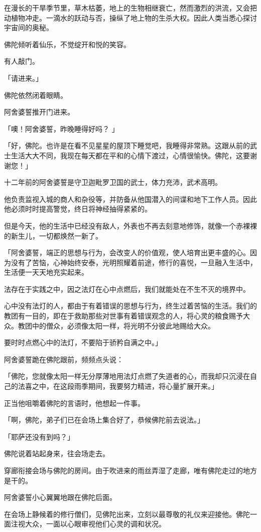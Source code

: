 \documentclass[twoside,openany]{book}
\begin{document}
在漫长的干旱季节里，草木枯萎，地上的生物相继衰亡，然而激烈的洪流，又会把动植物冲走。一滴水的跃动与否，操纵了地上物的生杀大权。因此人类当悉心探讨宇宙间的奥秘。

佛陀倾听着仙乐，不觉绽开和悦的笑容。

有人敲门。

「请进来。」

佛陀依然闭着眼睛。

阿舍婆誓推开门进来。

「噢！阿舍婆誓，昨晚睡得好吗？	」

「好，佛陀。也许是在看不见星星的屋顶下睡觉吧，我睡得非常熟。这跟从前的武士生活大大不同，我现在每天都在平和的心情下渡过，心情很愉快。佛陀，这要谢谢您！」

十二年前的阿舍婆誓是守卫迦毗罗卫国的武士，体力充沛，武术高明。

他负责监视入城的商人和杂役等，并防备从他国潜入的间谍和地下工作人员。因此他必须时时提高警觉，终日将神经抽得紧紧的。

但是今天，他的生活中已经没有敌人，外表也不再去刻意地修饰，就像一个赤裸裸的新生儿，一切都焕然一新了。

「阿舍婆誓，端正的思想与行为，会改变人的价值观，使人培育出更丰盛的心。因为没有了苦恼，心神始终安泰，光明照耀着前途，修行的喜悦，一旦融入生活中，生活便一天天地充实起来。

法存在于实践之中，因之法灯在心中点燃后，我们就能处在不生不灭的境界中。

心中没有法灯的人，都由于有着错误的思想与行为，终生过着苦恼的生活。我们的教团有一目的，即在于救助那些对世事有着错误观念的人，将心灵的粮食赐予大众。教团中的僧众，必须像太阳一样，将光明不分彼此地赐给大众。

要时时点燃心中的法灯，不要陷于骄矜自满之中。」

阿舍婆誓跪在佛陀跟前，频频点头说：

「佛陀，您就像太阳一样无分厚薄地用法灯点燃了失道者的心，而我却只沉浸在自己的法喜之中，在这段雨季期间，我要努力精进，将心量扩展开来。」

正当他咀嚼着佛陀的言语时，他想起一件事。

「啊，佛陀，弟子们已在会场上集合好了，恭候佛陀前去说法。」

「耶萨还没有到吗？」

佛陀说着站起身来，往会场走去。

穿廊衔接会场与佛陀的房间。由于吹进来的雨丝弄湿了走廊，唯有佛陀走过的地方是干的。

阿舍婆誓小心翼翼地跟在佛陀后面。

在会场上静候着的修行僧们，见佛陀出来，立刻以最尊敬的礼仪来迎接他。佛陀一面注视大众，一面以心眼审视他们心灵的调和状况。
\end{document}

